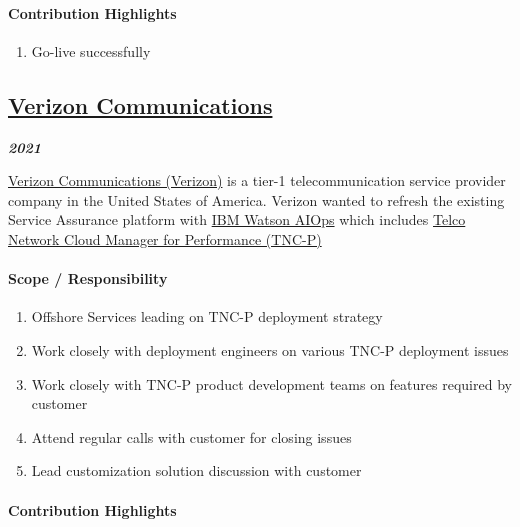 \documentclass[
]{article}
\providecommand{\tightlist}{%
  \setlength{\itemsep}{0pt}\setlength{\parskip}{0pt}}
\begin{document}
\hypertarget{contribution-highlights-1}{%
\paragraph{Contribution Highlights}\label{contribution-highlights-1}}

\begin{enumerate}
\def\labelenumi{\arabic{enumi}.}
\tightlist
\item
  Go-live successfully
\end{enumerate}

\hypertarget{verizon-communications}{%
\subsection{\texorpdfstring{\href{https://www.verizon.com/}{Verizon
Communications}}{Verizon Communications}}\label{verizon-communications}}

\textbf{\emph{2021}}

\href{https://www.verizon.com/}{Verizon Communications (Verizon)} is a
tier-1 telecommunication service provider company in the United States
of America. Verizon wanted to refresh the existing Service Assurance
platform with \href{https://www.ibm.com/watson/aiops-overview/}{IBM
Watson AIOps} which includes
\href{https://www.ibm.com/docs/en/tncm-p/1.4.2}{Telco Network Cloud
Manager for Performance (TNC-P)}

\hypertarget{scope-responsibility-2}{%
\paragraph{Scope / Responsibility}\label{scope-responsibility-2}}

\begin{enumerate}
\def\labelenumi{\arabic{enumi}.}
\tightlist
\item
  Offshore Services leading on TNC-P deployment strategy
\item
  Work closely with deployment engineers on various TNC-P deployment
  issues
\item
  Work closely with TNC-P product development teams on features required
  by customer
\item
  Attend regular calls with customer for closing issues
\item
  Lead customization solution discussion with customer
\end{enumerate}

\hypertarget{contribution-highlights-2}{%
\paragraph{Contribution Highlights}\label{contribution-highlights-2}}
\end{document}
